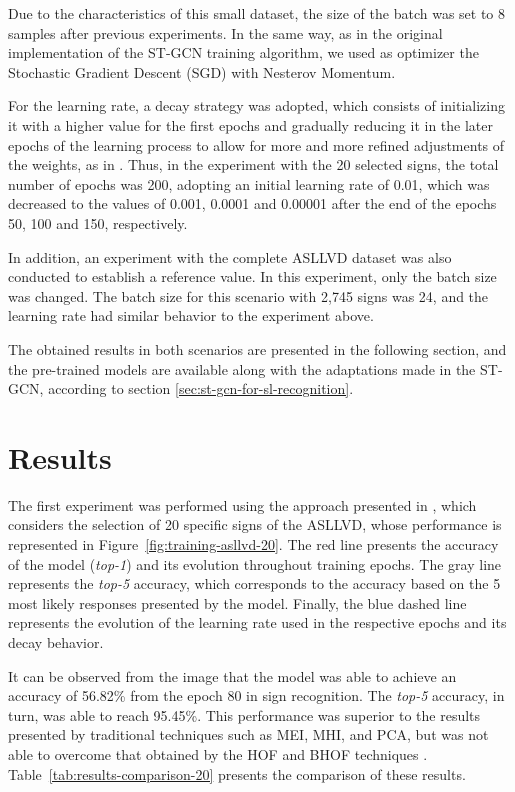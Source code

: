 Due to the characteristics of this small dataset, the size of the batch was set to 8 samples after previous experiments. 
In the same way, as in the original implementation of the ST-GCN training algorithm, we used as optimizer the Stochastic Gradient Descent (SGD) with Nesterov Momentum. 

For the learning rate, a decay strategy was adopted, which consists of initializing it with a higher value for the first epochs and gradually reducing it in the later epochs of the learning process to allow for more and more refined adjustments of the weights, as in \cite{st-gcn-2018}. Thus, in the experiment with the 20 selected signs, the total number of epochs was 200, adopting an initial learning rate of 0.01, which was decreased to the values of 0.001, 0.0001 and 0.00001 after the end of the epochs 50, 100 and 150, respectively.

In addition, an experiment with the complete ASLLVD dataset was also conducted to establish a reference value. In this experiment, only the batch size was changed. The batch size for this scenario with 2,745 signs was 24, and the learning rate had similar behavior to the experiment above.

The obtained results in both scenarios are presented in the following section, and the pre-trained models are available along with the adaptations made in the ST-GCN, according to section \ref{sec:st-gcn-for-sl-recognition}.


\section{Results} 
\label{sec:results}

The first experiment was performed using the approach presented in \cite{lim-2016}, which considers the selection of 20 specific signs of the ASLLVD, whose performance is represented in Figure~\ref{fig:training-asllvd-20}. The red line presents the accuracy of the model (\textit{top-1}) and its evolution throughout training epochs. The gray line represents the \textit{top-5} accuracy, which corresponds to the accuracy based on the 5 most likely responses presented by the model. Finally, the blue dashed line represents the evolution of the learning rate used in the respective epochs and its decay behavior.

It can be observed from the image that the model was able to achieve an accuracy of 56.82\% from the epoch 80 in sign recognition. The \textit{top-5} accuracy, in turn, was able to reach 95.45\%. This performance was superior to the results presented by traditional techniques such as MEI, MHI, and PCA, but was not able to overcome that obtained by the HOF and BHOF techniques \cite{lim-2016}. Table~\ref{tab:results-comparison-20} presents the comparison of these results.

